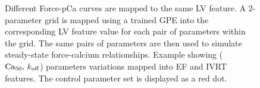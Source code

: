 \begin{figure}[ht!]
    \myfloatalign
    \quad
    \caption{Different Force-pCa curves are mapped to the same LV feature. A $2$-parameter grid is mapped using a trained GPE into the corresponding LV feature value for each pair of parameters within the grid. The same pairs of parameters are then used to simulate steady-state force-calcium relationships. Example showing ($\textrm{Ca}_{50},\,k_{\textrm{off}}$) parameters variations mapped into EF and IVRT features. The control parameter set is displayed as a red dot.}\label{fig:twoparamssamefeatdifffpca}
\end{figure}